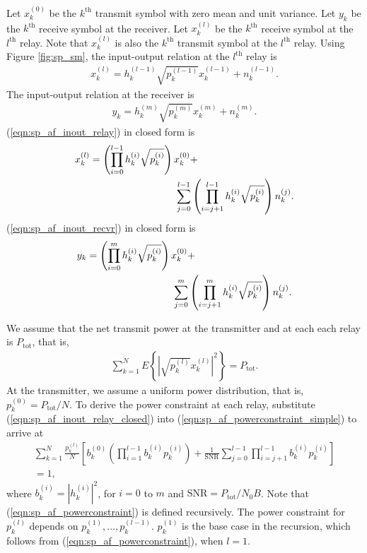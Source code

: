 \documentclass[conference]{IEEEtran}
\begin{document}
Let $x_k^{(0)}$ be the $k^{\mbox{th}}$ transmit symbol with zero mean and unit variance.  Let $y_k$ be the $k^{\mbox{th}}$ receive symbol at the receiver.  Let $x_k^{(l)}$ be the $k^{\mbox{th}}$ receive symbol at the $l^{\mbox{th}}$ relay.  Note that $x_k^{(l)}$ is also the $k^{\mbox{th}}$ transmit symbol at the $l^{\mbox{th}}$ relay.  Using Figure \ref{fig:sp_sm}, the input-output relation at the $l^{\mbox{th}}$ relay is
\begin{eqnarray}
x_k^{(l)} = h_k^{(l-1)} \sqrt{p_k^{(l-1)}} x_k^{(l-1)} +
n_k^{(l-1)}. \label{eqn:sp_af_inout_relay}
\end{eqnarray}
The input-output relation at the receiver is
\begin{eqnarray}
y_k = h_k^{(m)} \sqrt{p_k^{(m)}} x_k^{(m)} + n_k^{(m)}.
\label{eqn:sp_af_inout_recvr}
\end{eqnarray}
(\ref{eqn:sp_af_inout_relay}) in closed form is
\begin{eqnarray}
x_k^{(l)} = \left( \prod_{i=0}^{l-1} h_k^{(i)} \sqrt{p_k^{(i)}}
\right) x_k^{(0)} + \hspace{1.35in} \nonumber \\
\hspace{1.35in} \sum_{j=0}^{l-1} \left( \prod_{i=j+1}^{l-1}
h_k^{(i)} \sqrt{p_k^{(i)}} \right) n_k^{(j)} .
\label{eqn:sp_af_inout_relay_closed}
\end{eqnarray}
(\ref{eqn:sp_af_inout_recvr}) in closed form is
\begin{eqnarray}
y_k = \left( \prod_{i=0}^m h_k^{(i)} \sqrt{p_k^{(i)}} \right)
x_k^{(0)} + \hspace{1.35in} \nonumber \\
\hspace{1.35in} \sum_{j=0}^m \left( \prod_{i=j+1}^m h_k^{(i)}
\sqrt{p_k^{(i)}} \right) n_k^{(j)} .
\end{eqnarray}

We assume that the net transmit power at the transmitter and at each each relay is $P_{\mbox{tot}}$, that is,
\begin{eqnarray}
\sum_{k=1}^N E \left\{ \left| \sqrt{p_k^{(l)}} x_k^{(l)} \right| ^2 \right\} = P_{\mbox{tot}}.
\label{eqn:sp_af_powerconstraint_simple}
\end{eqnarray}
At the transmitter, we assume a uniform power distribution, that is, $p_k^{(0)} = P_{\mbox{tot}}/N$.  To derive the power constraint at each relay, substitute (\ref{eqn:sp_af_inout_relay_closed}) into (\ref{eqn:sp_af_powerconstraint_simple}) to arrive at
\begin{eqnarray}
\sum_{k=1}^N \frac{ p_k^{(l)}}{N} \left[
b_k^{(0)} \left( \prod_{i=1}^{l-1}  b_k^{(i)}p_k^{(i)} \right) +
\frac{1}{\mbox{SNR}} \sum_{j=0}^{l-1} \prod_{i=j+1}^{l-1}  b_k^{(i)}p_k^{(i)} \right] \nonumber \\
=1,
\label{eqn:sp_af_powerconstraint}
\end{eqnarray}
where  $b_k^{(i)} = \left| h_k^{(i)} \right|^2$, for $i=0$ to $m$ and $\mbox{SNR} = P_{\mbox{tot}} / N_0 B$.  Note that (\ref{eqn:sp_af_powerconstraint}) is defined recursively.  The power constraint for $p_k^{(l)}$ depends on $p_k^{(1)}, \dots, p_k^{(l-1)}$.  $p_k^{(1)}$ is the base case in the recursion, which follows from (\ref{eqn:sp_af_powerconstraint}), when $l = 1$.
\end{document}
